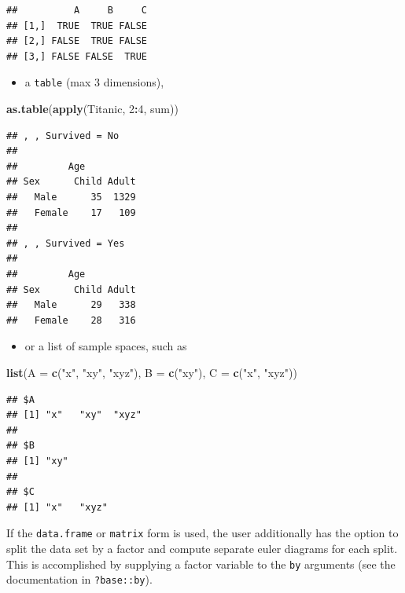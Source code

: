 \documentclass[
  headsepline=true,headings=standardclasses%
]{scrartcl}
\newenvironment{Shaded}{\begin{snugshade}}{\end{snugshade}}
\newcommand{\KeywordTok}[1]{\textcolor[rgb]{0.13,0.29,0.53}{\textbf{#1}}}
\newcommand{\DataTypeTok}[1]{\textcolor[rgb]{0.13,0.29,0.53}{#1}}
\newcommand{\DecValTok}[1]{\textcolor[rgb]{0.00,0.00,0.81}{#1}}
\newcommand{\StringTok}[1]{\textcolor[rgb]{0.31,0.60,0.02}{#1}}
\newcommand{\OperatorTok}[1]{\textcolor[rgb]{0.81,0.36,0.00}{\textbf{#1}}}
\newcommand{\NormalTok}[1]{#1}
\providecommand{\tightlist}{\setlength{\itemsep}{0pt}\setlength{\parskip}{0pt}}
\theoremstyle{definition}
\theoremstyle{definition}
\theoremstyle{remark}
\begin{document}
\begin{verbatim}
##          A     B     C
## [1,]  TRUE  TRUE FALSE
## [2,] FALSE  TRUE FALSE
## [3,] FALSE FALSE  TRUE
\end{verbatim}

\begin{itemize}
\tightlist
\item
  a \texttt{table} (max 3 dimensions),
\end{itemize}

\begin{Shaded}
\begin{Highlighting}[]
\KeywordTok{as.table}\NormalTok{(}\KeywordTok{apply}\NormalTok{(Titanic, }\DecValTok{2}\OperatorTok{:}\DecValTok{4}\NormalTok{, sum))}
\end{Highlighting}
\end{Shaded}

\begin{verbatim}
## , , Survived = No
## 
##         Age
## Sex      Child Adult
##   Male      35  1329
##   Female    17   109
## 
## , , Survived = Yes
## 
##         Age
## Sex      Child Adult
##   Male      29   338
##   Female    28   316
\end{verbatim}

\begin{itemize}
\tightlist
\item
  or a list of sample spaces, such as
\end{itemize}

\begin{Shaded}
\begin{Highlighting}[]
\KeywordTok{list}\NormalTok{(}\DataTypeTok{A =} \KeywordTok{c}\NormalTok{(}\StringTok{"x"}\NormalTok{, }\StringTok{"xy"}\NormalTok{, }\StringTok{"xyz"}\NormalTok{),}
     \DataTypeTok{B =} \KeywordTok{c}\NormalTok{(}\StringTok{"xy"}\NormalTok{),}
     \DataTypeTok{C =} \KeywordTok{c}\NormalTok{(}\StringTok{"x"}\NormalTok{, }\StringTok{"xyz"}\NormalTok{))}
\end{Highlighting}
\end{Shaded}

\begin{verbatim}
## $A
## [1] "x"   "xy"  "xyz"
## 
## $B
## [1] "xy"
## 
## $C
## [1] "x"   "xyz"
\end{verbatim}

If the \texttt{data.frame} or \texttt{matrix} form is used, the user
additionally has the option to split the data set by a factor and
compute separate euler diagrams for each split. This is accomplished by
supplying a factor variable to the \texttt{by} arguments (see the
documentation in \texttt{?base::by}).
\end{document}
